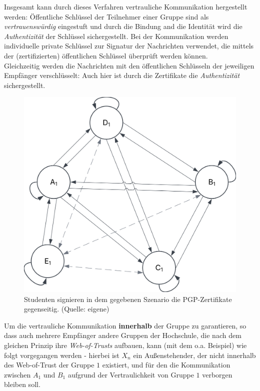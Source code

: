 \noindent
Insgesamt kann durch dieses Verfahren vertrauliche Kommunikation hergestellt werden: Öffentliche Schlüssel der Teilnehmer einer Gruppe sind als \textit{vertrauenswürdig} eingestuft und durch die Bindung and die Identität wird die \textit{Authentizität} der Schlüssel sichergestellt.
Bei der Kommunikation werden individuelle private Schlüssel zur Signatur der Nachrichten verwendet, die mittels der (zertifizierten) öffentlichen Schlüssel überprüft werden können.\\
Gleichzeitig werden die Nachrichten mit den öffentlichen Schlüsseln der jeweiligen Empfänger verschlüsselt: Auch hier ist durch die Zertifikate die \textit{Authentizität} sichergestellt.

\begin{figure}
    \centering
    \includegraphics[scale=0.4]{aufgabe 1/img/weboftrust.svg}
    \caption{Studenten signieren in dem gegebenen Szenario die PGP-Zertifikate gegenseitig. (Quelle: eigene)}
    \label{fig:weboftrust}
\end{figure}

\noindent
Um die vertrauliche Kommunikation \textbf{innerhalb} der Gruppe zu garantieren, so dass auch mehrere Empfänger  andere Gruppen der Hochschule, die nach dem gleichen Prinzip ihre \textit{Web-of-Trusts} aufbauen, kann (mit dem o.a. Beispiel) wie folgt vorgegangen werden - hierbei ist $X_n$ ein Außenstehender, der nicht innerhalb des Web-of-Trust der Gruppe $1$ existiert, und für den die Kommunikation zwischen $A_1$ und $B_1$ aufgrund der Vertraulichkeit von Gruppe $1$ verborgen bleiben soll.

